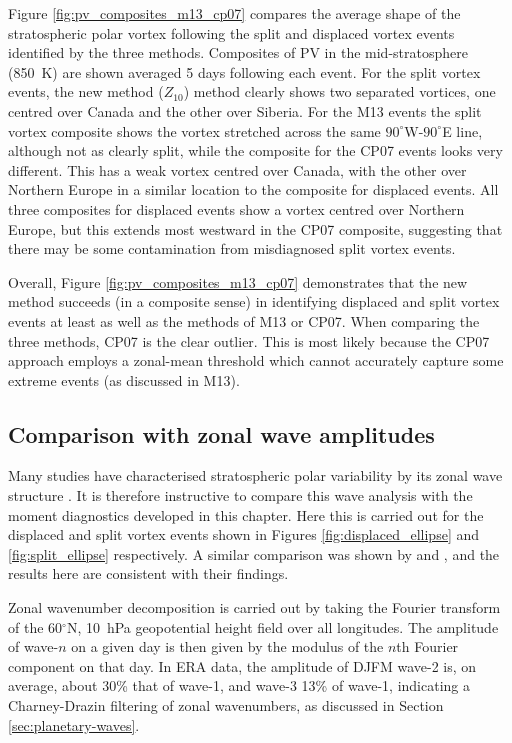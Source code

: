 Figure \ref{fig:pv_composites_m13_cp07} compares the average shape of the
stratospheric polar vortex following the split and displaced vortex events
identified by the three methods. Composites of PV in the mid-stratosphere
(850~K) are shown averaged 5 days following each event. For the split vortex
events, the new method ($Z_{10}$) method clearly shows two separated
vortices, one centred over Canada and the other over Siberia. For the M13 events
the split vortex composite shows the vortex stretched across the same
$90^{\circ}$W-$90^{\circ}$E line, although not as clearly split, while the
composite for the CP07 events looks very different. This has a weak vortex
centred over Canada, with the other over Northern Europe in a similar location
to the composite for displaced events. All three composites for displaced events
show a vortex centred over Northern Europe, but this extends most westward in
the CP07 composite, suggesting that there may be some contamination from
misdiagnosed split vortex events.

Overall, Figure \ref{fig:pv_composites_m13_cp07} demonstrates that the new
method succeeds (in a composite sense) in identifying displaced and split vortex
events at least as well as the methods of M13 or CP07. When comparing the three
methods, CP07 is the clear outlier. This is most likely because the CP07
approach employs a zonal-mean threshold which cannot accurately capture some
extreme events (as discussed in M13).


\subsection{Comparison with zonal wave amplitudes}
\label{sec:comp-zonal-wave}

Many studies have characterised stratospheric polar variability by its zonal
wave structure \citep[e.g,][]{Randel1988,Yoden1999,Nakagawa2006,Bancala2012}. It
is therefore instructive to compare this wave analysis with the moment
diagnostics developed in this chapter. Here this is carried out for the
displaced and split vortex events shown in Figures \ref{fig:displaced_ellipse}
and \ref{fig:split_ellipse} respectively. A similar comparison was shown by
\citet{Waugh1997} and \citet{Waugh1999}, and the results here are consistent
with their findings.

Zonal wavenumber decomposition is carried out by taking the Fourier transform of
the 60$^{\circ}$N, 10~hPa geopotential height field over all longitudes. The
amplitude of wave-$n$ on a given day is then given by the modulus of the $n$th
Fourier component on that day. In ERA data, the amplitude of DJFM wave-2 is, on
average, about 30\% that of wave-1, and wave-3 13\% of wave-1, indicating a
Charney-Drazin filtering of zonal wavenumbers, as discussed in Section
\ref{sec:planetary-waves}.

